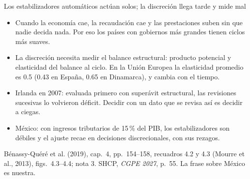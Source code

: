 \documentclass[aspectratio=169,11pt]{beamer}
\newcommand{\fuente}[1]{\par\vfill{\small\color{cGris}#1\par}}
\newcommand{\BQ}{Bénassy-Quéré et al. (2019), cap.~4}
\begin{document}
\begin{frame}{Los estabilizadores automáticos actúan solos; la discreción llega tarde y mide mal}
  \begin{itemize}
    \item<1-> Cuando la economía cae, la recaudación cae y las prestaciones suben sin que nadie decida nada. Por eso los países con gobiernos más grandes tienen ciclos más suaves.
    \item<2-> La discreción necesita medir el balance estructural: producto potencial y elasticidad del balance al ciclo. En la Unión Europea la elasticidad promedio es 0.5 (0.43 en España, 0.65 en Dinamarca), y cambia con el tiempo.
    \item<3-> Irlanda en 2007: evaluada primero con superávit estructural, las revisiones sucesivas lo volvieron déficit. Decidir con un dato que se revisa así es decidir a ciegas.
    \item<4-> México: con ingresos tributarios de 15\,\% del PIB, los estabilizadores son débiles y el ajuste recae en decisiones discrecionales, con sus rezagos.
  \end{itemize}
  \fuente{\BQ, pp.~154--158, recuadros 4.2 y 4.3 (Mourre et al., 2013), figs.~4.3--4.4; nota 3. SHCP, \emph{CGPE 2027}, p.~55. La frase sobre México es nuestra.}
\end{frame}
\end{document}
